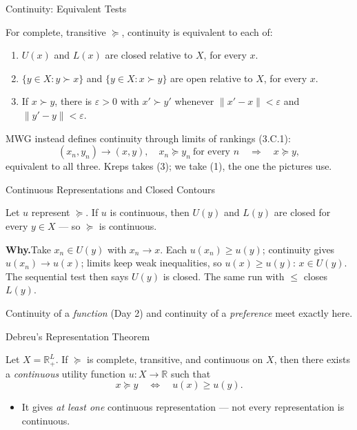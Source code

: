 \documentclass[11pt,aspectratio=169,c]{beamer}
\begin{document}
\begin{frame}{Continuity: Equivalent Tests}
\begin{propositionbox}
For complete, transitive $\succeq$, continuity is equivalent to each of:
\begin{enumerate}
    \item $U(x)$ and $L(x)$ are closed relative to $X$, for every $x$.
    \item $\{y\in X:y\succ x\}$ and $\{y\in X:x\succ y\}$ are open relative to
    $X$, for every $x$.
    \item If $x\succ y$, there is $\varepsilon>0$ with $x'\succ y'$ whenever
    $\lVert x'-x\rVert<\varepsilon$ and $\lVert y'-y\rVert<\varepsilon$.
\end{enumerate}
\end{propositionbox}

MWG instead defines continuity through limits of rankings (3.C.1):
\[
(x_n,y_n)\to(x,y),\quad x_n\succeq y_n\ \text{for every }n\quad\Longrightarrow\quad x\succeq y,
\]
equivalent to all three. Kreps takes (3); we take (1), the one the
pictures use.
\end{frame}

\begin{frame}{Continuous Representations and Closed Contours}
\begin{theorembox}
Let $u$ represent $\succeq$. If $u$ is continuous, then $U(y)$ and $L(y)$ are closed
for every $y\in X$ --- so $\succeq$ is continuous.
\end{theorembox}

\textbf{Why.}\quad Take $x_n\in U(y)$ with $x_n\to x$. Each $u(x_n)\geq u(y)$; continuity
gives $u(x_n)\to u(x)$; limits keep weak inequalities, so $u(x)\geq u(y)$: $x\in U(y)$.
The sequential test then says $U(y)$ is closed. The same run with $\leq$ closes $L(y)$.

\vspace{.3em}
\centering Continuity of a \emph{function} (Day 2) and continuity of a \emph{preference} meet
exactly here.
\end{frame}

\begin{frame}{Debreu's Representation Theorem}
\begin{theorembox}
Let $X=\mathbb{R}_+^L$. If $\succeq$ is complete, transitive, and continuous on
$X$, then there exists a \emph{continuous} utility function $u:X\to\mathbb{R}$ such that
\[
x\succeq y \quad\Longleftrightarrow\quad u(x)\geq u(y).
\]
\end{theorembox}

\begin{itemize}
    \item It gives \emph{at least one} continuous representation --- not every
    representation is continuous.
\end{itemize}

\end{frame}
\end{document}
